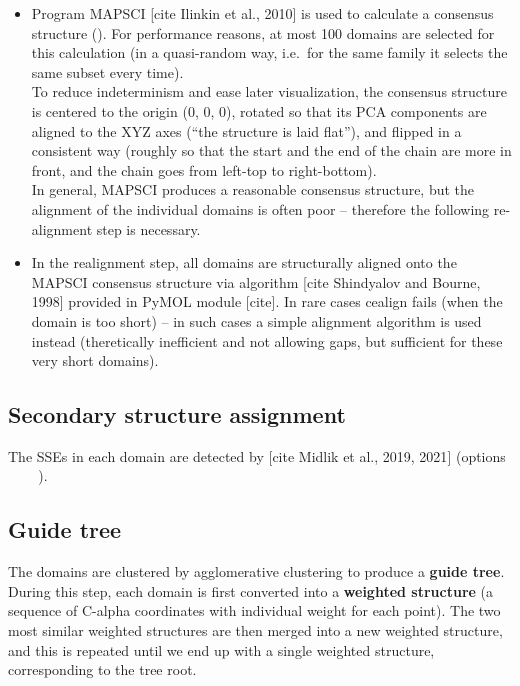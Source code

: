 \documentclass{article}
\begin{document}
\begin{itemize}
\item
  Program MAPSCI {[}cite Ilinkin et al., 2010{]} is used to calculate a
  consensus structure ().
  For performance reasons, at most 100 domains are selected for this
  calculation (in a quasi-random way, i.e.~for the same family it selects 
  the same subset every time).\\
  To reduce indeterminism and ease later visualization, the consensus
  structure is centered to the origin (0, 0, 0), rotated so that its PCA
  components are aligned to the XYZ axes (``the structure is laid
  flat''), and flipped in a consistent way (roughly so that the start and 
  the end of the chain are more in front, and the chain goes from left-top 
  to right-bottom).\\
  In general, MAPSCI produces a reasonable consensus structure, but the
  alignment of the individual domains is often poor -- therefore the
  following re-alignment step is necessary.
\item
  In the realignment step, all domains are structurally aligned onto the
  MAPSCI consensus structure via  algorithm {[}cite Shindyalov
  and Bourne, 1998{]} provided in PyMOL module {[}cite{]}. In rare cases
  cealign fails (when the domain is too short) -- in such cases a
  simple alignment algorithm  is used instead
  (theretically inefficient and not allowing gaps, but sufficient for these
  very short domains).
\end{itemize}



\subsection{Secondary structure assignment}

The SSEs in each domain are detected by  {[}cite
Midlik et al., 2019, 2021{]} (options ~
~ ~).



\subsection{Guide tree}

The domains are clustered by agglomerative clustering to produce a \textbf{guide
tree}. During this step, each domain is first converted into a
\textbf{weighted structure} (a sequence of C-alpha coordinates with
individual weight for each point). The two most similar weighted
structures are then merged into a new weighted structure, and this is
repeated until we end up with a single weighted structure, corresponding
to the tree root.
\end{document}
